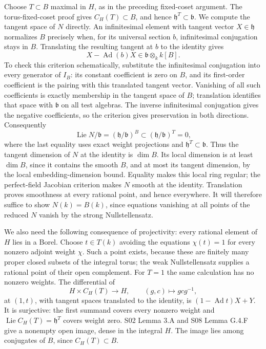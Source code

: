 \documentclass[11pt,a4paper,openany]{report}
\newcounter{none}
\begin{document}
Choose \(T\subset B\) maximal in \(H\), as in the preceding fixed-coset argument. The torus-fixed-coset proof gives \(C_H(T)\subset B\), and hence \(\mathfrak h^T\subset\mathfrak b\). We compute the tangent space of \(N\) directly. An infinitesimal element with tangent vector \(X\in\mathfrak h\) normalizes \(B\) precisely when, for its universal section \(b\), infinitesimal conjugation stays in \(B\). Translating the resulting tangent at \(b\) to the identity gives \[
 X-\operatorname{Ad}(b)X\in\mathfrak b\otimes_k k[B].
\] To check this criterion schematically, substitute the infinitesimal conjugation into every generator of \(I_B\): its constant coefficient is zero on \(B\), and its first-order coefficient is the pairing with this translated tangent vector. Vanishing of all such coefficients is exactly membership in the tangent space of \(B\); translation identifies that space with \(\mathfrak b\) on all test algebras. The inverse infinitesimal conjugation gives the negative coefficients, so the criterion gives preservation in both directions. Consequently \[
 \operatorname{Lie}N/\mathfrak b=(\mathfrak h/\mathfrak b)^B
 \subset(\mathfrak h/\mathfrak b)^T=0,
\] where the last equality uses exact weight projections and \(\mathfrak h^T\subset\mathfrak b\). Thus the tangent dimension of \(N\) at the identity is \(\dim B\). Its local dimension is at least \(\dim B\), since it contains the smooth \(B\), and at most its tangent dimension, by the local embedding-dimension bound. Equality makes this local ring regular; the perfect-field Jacobian criterion makes \(N\) smooth at the identity. Translation proves smoothness at every rational point, and hence everywhere. It will therefore suffice to show \(N(k)=B(k)\), since equations vanishing at all points of the reduced \(N\) vanish by the strong Nullstellensatz.

We also need the following consequence of projectivity: every rational element of \(H\) lies in a Borel. Choose \(t\in T(k)\) avoiding the equations \(\chi(t)=1\) for every nonzero adjoint weight \(\chi\). Such a point exists, because these are finitely many proper closed subsets of the integral torus; the weak Nullstellensatz supplies a rational point of their open complement. For \(T=1\) the same calculation has no nonzero weights. The differential of \[
 H\times C_H(T)\longrightarrow H,\qquad(g,c)\longmapsto gcg^{-1},
\] at \((1,t)\), with tangent spaces translated to the identity, is \((1-\operatorname{Ad}t)X+Y\). It is surjective: the first summand covers every nonzero weight and \(\operatorname{Lie}C_H(T)=\mathfrak h^T\) covers weight zero. S02 Lemma 3.A and S08 Lemma G.4.F give a nonempty open image, dense in the integral \(H\). The image lies among conjugates of \(B\), since \(C_H(T)\subset B\).
\end{document}

